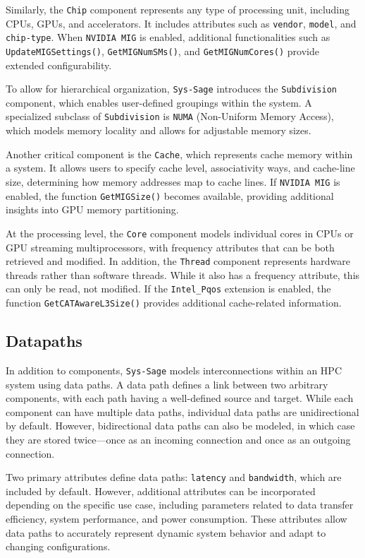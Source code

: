 Similarly, the \texttt{Chip} component represents any type of processing unit, including CPUs, GPUs, and accelerators. It includes attributes such as \texttt{vendor}, \texttt{model}, and \texttt{chip-type}. When \texttt{NVIDIA MIG} is enabled, additional functionalities such as \texttt{UpdateMIGSettings()}, \texttt{GetMIGNumSMs()}, and \texttt{GetMIGNumCores()} provide extended configurability.

To allow for hierarchical organization, \texttt{Sys-Sage} introduces the \texttt{Subdivision} component, which enables user-defined groupings within the system. A specialized subclass of \texttt{Subdivision} is \texttt{NUMA} (Non-Uniform Memory Access), which models memory locality and allows for adjustable memory sizes.

Another critical component is the \texttt{Cache}, which represents cache memory within a system. It allows users to specify cache level, associativity ways, and cache-line size, determining how memory addresses map to cache lines. If \texttt{NVIDIA MIG} is enabled, the function \texttt{GetMIGSize()} becomes available, providing additional insights into GPU memory partitioning.

At the processing level, the \texttt{Core} component models individual cores in CPUs or GPU streaming multiprocessors, with frequency attributes that can be both retrieved and modified. In addition, the \texttt{Thread} component represents hardware threads rather than software threads. While it also has a frequency attribute, this can only be read, not modified. If the \texttt{Intel\_Pqos} extension is enabled, the function \texttt{GetCATAwareL3Size()} provides additional cache-related information.

\subsection{Datapaths}

In addition to components, \texttt{Sys-Sage} models interconnections within an \ac{HPC} system using data paths. A data path defines a link between two arbitrary components, with each path having a well-defined source and target. While each component can have multiple data paths, individual data paths are unidirectional by default. However, bidirectional data paths can also be modeled, in which case they are stored twice—once as an incoming connection and once as an outgoing connection.

Two primary attributes define data paths: \texttt{latency} and \texttt{bandwidth}, which are included by default. However, additional attributes can be incorporated depending on the specific use case, including parameters related to data transfer efficiency, system performance, and power consumption. These attributes allow data paths to accurately represent dynamic system behavior and adapt to changing configurations.

